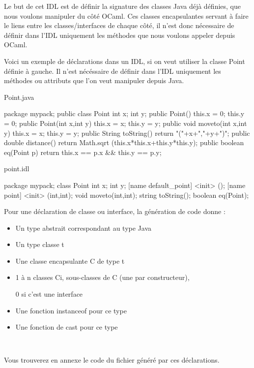 \documentclass[a4paper, 11pt]{article}
\begin{document}
Le but de cet IDL est de définir la signature des
classes Java déjà définies, que nous voulons manipuler du côté OCaml.
Ces classes encapsulantes servant à faire le liens entre les
classes/interfaces de chaque côté, il n'est donc nécessaire de définir
dans l'IDL uniquement les méthodes que nous voulons appeler depuis OCaml.

Voici un exemple de déclarations dans un IDL, si on veut utiliser la classe Point définie à gauche. Il n'est nécéssaire de définir dans l'IDL uniquement les méthodes ou attributs que l'on veut manipuler depuis Java.


\begin{multicols}{2}
Point.java
\begin{javaEx}
  package mypack;
  public class Point {
    int x;
    int y;
    public Point() { 
      this.x = 0;
      this.y = 0;
    }
    public Point(int x,int y) {
      this.x = x;
      this.y = y;
    }
    public void moveto(int x,int y){
      this.x = x;
      this.y = y;
    }
    public String toString() {
      return "("+x+","+y+")";
    }
    public double distance() {
      return Math.sqrt
      (this.x*this.x+this.y*this.y);
    }
    public boolean eq(Point p) {
      return this.x == p.x 
          && this.y == p.y;
    }
  }
\end{javaEx}

\bigskip

point.idl
\begin{idlEx}
package mypack;
class Point {
  int x;
  int y; 
  [name default_point] <init> ();
  [name point] <init> (int,int);
  void moveto(int,int);
  string toString();
  boolean eq(Point);
}
\end{idlEx}

Pour une déclaration de classe ou interface, la génération de code
donne :
\begin{itemize}
  \item Un type abstrait correspondant au type Java
  \item Un type classe t
  \item Une classe encapsulante C de type t
  \item 1 à n classes Ci, sous-classes de C (une par constructeur),
 
    0 si c'est une interface
  \item Une fonction instanceof pour ce type
  \item Une fonction de cast pour ce type
\end{itemize}

\ 
\newline

\bigskip

\end{multicols}
Vous trouverez en annexe le code du fichier généré par ces déclarations.
\end{document}
